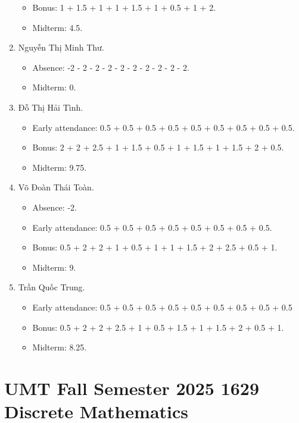 \documentclass{article}
\begin{document}
\begin{enumerate}
\begin{itemize}
		\item Bonus: 1 + 1.5 + 1 + 1 + 1.5 + 1 + 0.5 + 1 + 2.
        \item Midterm: 4.5.
	\end{itemize}
	\item {\sc Nguyễn Thị Minh Thư.}
	\begin{itemize}
		\item Absence: -2 - 2 - 2 - 2 - 2 - 2 - 2 - 2 - 2 - 2.
        \item Midterm: 0.
	\end{itemize}
	\item {\sc Đỗ Thị Hải Tình.}
	\begin{itemize}
		\item Early attendance: 0.5 + 0.5 + 0.5 + 0.5 + 0.5 + 0.5 + 0.5 + 0.5 + 0.5.
		\item Bonus: 2 + 2 + 2.5 + 1 + 1.5 + 0.5 + 1 + 1.5 + 1 + 1.5 + 2 + 0.5.
        \item Midterm: 9.75.
	\end{itemize}
	\item {\sc Võ Đoàn Thái Toàn.}
	\begin{itemize}
		\item Absence: -2.
		\item Early attendance: 0.5 + 0.5 + 0.5 + 0.5 + 0.5 + 0.5 + 0.5 + 0.5.
		\item Bonus: 0.5 + 2 + 2 + 1 + 0.5 + 1 + 1 + 1.5 + 2 + 2.5 + 0.5 + 1.
        \item Midterm: 9.
	\end{itemize}
	\item {\sc Trần Quốc Trung.}
	\begin{itemize}
		\item Early attendance: 0.5 + 0.5 + 0.5 + 0.5 + 0.5 + 0.5 + 0.5 + 0.5 + 0.5
		\item Bonus: 0.5 + 2 + 2 + 2.5 + 1 + 0.5 + 1.5 + 1 + 1.5 + 2 + 0.5 + 1.
        \item Midterm: 8.25.
	\end{itemize}
\end{enumerate}


\section{UMT Fall Semester 2025 1629 Discrete Mathematics}
\end{document}
